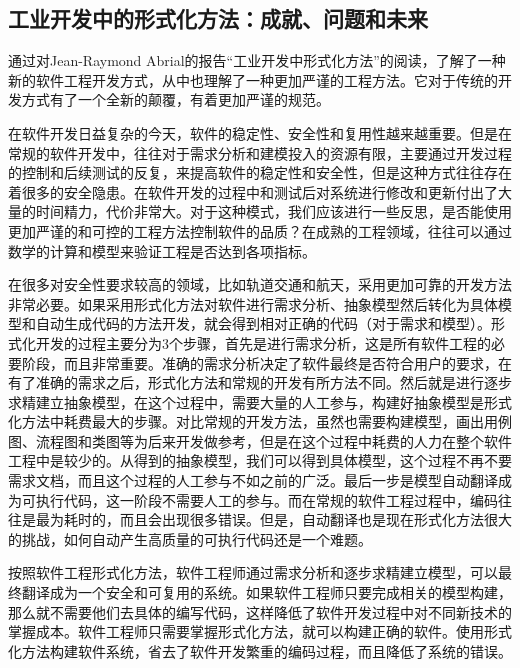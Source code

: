 \documentclass{article}
\begin{document}
\begin{CJK}{UTF8}{gbsn}
\begin{spacing}{1.4}
\section{工业开发中的形式化方法：成就、问题和未来}
通过对Jean-Raymond Abrial的报告“工业开发中形式化方法”的阅读，了解了一种新的软件工程开发方式，从中也理解了一种更加严谨的工程方法。它对于传统的开发方式有了一个全新的颠覆，有着更加严谨的规范。
\par
在软件开发日益复杂的今天，软件的稳定性、安全性和复用性越来越重要。但是在常规的软件开发中，往往对于需求分析和建模投入的资源有限，主要通过开发过程的控制和后续测试的反复，来提高软件的稳定性和安全性，但是这种方式往往存在着很多的安全隐患。在软件开发的过程中和测试后对系统进行修改和更新付出了大量的时间精力，代价非常大。对于这种模式，我们应该进行一些反思，是否能使用更加严谨的和可控的工程方法控制软件的品质？在成熟的工程领域，往往可以通过数学的计算和模型来验证工程是否达到各项指标。
\par
在很多对安全性要求较高的领域，比如轨道交通和航天，采用更加可靠的开发方法非常必要。如果采用形式化方法对软件进行需求分析、抽象模型然后转化为具体模型和自动生成代码的方法开发，就会得到相对正确的代码（对于需求和模型）。形式化开发的过程主要分为3个步骤，首先是进行需求分析，这是所有软件工程的必要阶段，而且非常重要。准确的需求分析决定了软件最终是否符合用户的要求，在有了准确的需求之后，形式化方法和常规的开发有所方法不同。然后就是进行逐步求精建立抽象模型，在这个过程中，需要大量的人工参与，构建好抽象模型是形式化方法中耗费最大的步骤。对比常规的开发方法，虽然也需要构建模型，画出用例图、流程图和类图等为后来开发做参考，但是在这个过程中耗费的人力在整个软件工程中是较少的。从得到的抽象模型，我们可以得到具体模型，这个过程不再不要需求文档，而且这个过程的人工参与不如之前的广泛。最后一步是模型自动翻译成为可执行代码，这一阶段不需要人工的参与。而在常规的软件工程过程中，编码往往是最为耗时的，而且会出现很多错误。但是，自动翻译也是现在形式化方法很大的挑战，如何自动产生高质量的可执行代码还是一个难题。
\par
按照软件工程形式化方法，软件工程师通过需求分析和逐步求精建立模型，可以最终翻译成为一个安全和可复用的系统。如果软件工程师只要完成相关的模型构建，那么就不需要他们去具体的编写代码，这样降低了软件开发过程中对不同新技术的掌握成本。软件工程师只需要掌握形式化方法，就可以构建正确的软件。使用形式化方法构建软件系统，省去了软件开发繁重的编码过程，而且降低了系统的错误。
\end{spacing}
\end{CJK}
\end{document}
